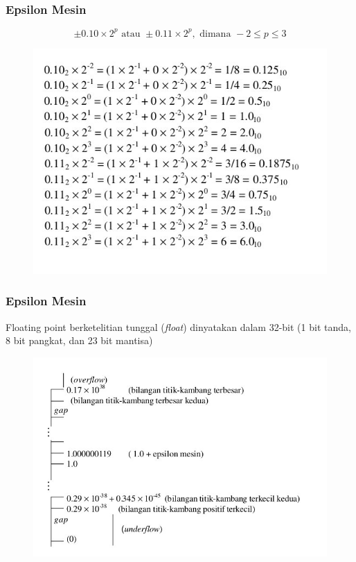 \documentclass{beamer}
\begin{document}

\begin{frame}
\frametitle{Epsilon Mesin}
\begin{equation}
\pm 0.10 \times 2^p \text{ atau } \pm 0.11 \times 2^p,\text{ dimana } -2 \leq p \leq 3
\nonumber
\end{equation}
\begin{figure}[htp]
\centering
\includegraphics[scale=0.50]{6bit.jpg}
\end{figure}
\end{frame}


\begin{frame}
\frametitle{Epsilon Mesin}
Floating point berketelitian tunggal (\textit{float}) dinyatakan dalam 32-bit (1 bit tanda, 8 bit pangkat, dan 23 bit mantisa)
\begin{figure}[htp]
\centering
\includegraphics[scale=0.40]{32bit.jpg}
\end{figure}
\end{frame}
\end{document}
